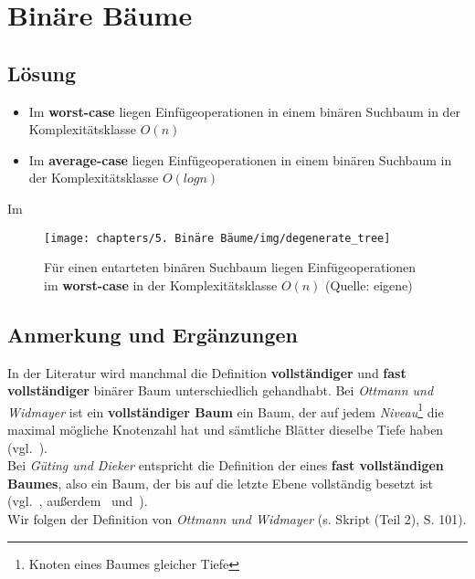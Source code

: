 \chapter{Binäre Bäume}

\section{Lösung}

\begin{itemize}
    \item Im \textbf{worst-case} liegen Einfügeoperationen in einem binären Suchbaum in der Komplexitätsklasse $O(n)$
    \item Im \textbf{average-case} liegen Einfügeoperationen in einem binären Suchbaum in der Komplexitätsklasse $O(log n)$
\end{itemize}

Im \textbf{}


\begin{figure}
    \begin{center}
        \texttt{[image: chapters/5. Binäre Bäume/img/degenerate\_tree]}
        \caption{Für einen entarteten binären Suchbaum liegen Einfügeoperationen im \textbf{worst-case} in der Komplexitätsklasse $O(n)$ (Quelle: eigene)}
        \label{fig:degeneratetree}
    \end{center}
\end{figure}

\section{Anmerkung und Ergänzungen}


\noindent
In der Literatur wird manchmal die Definition \textbf{vollständiger} und \textbf{fast vollständiger} binärer Baum unterschiedlich gehandhabt.
Bei \textit{Ottmann und Widmayer} ist ein \textbf{vollständiger Baum} ein Baum, der auf jedem \textit{Niveau}\footnote{Knoten eines Baumes gleicher Tiefe} die maximal mögliche Knotenzahl hat und sämtliche Blätter dieselbe Tiefe haben (vgl.~\cite[261]{OW17e}).\\
Bei \textit{Güting und Dieker} entspricht die Definition der eines \textbf{fast vollständigen Baumes}, also ein Baum, der bis auf die letzte Ebene vollständig besetzt ist (vgl.~\cite[96]{GD18c}, außerdem~\cite[161]{CL22} und~\cite[401]{Knu97a}).\\
Wir folgen der Definition von \textit{Ottmann und Widmayer} (s. Skript (Teil 2), S.  101).\\


